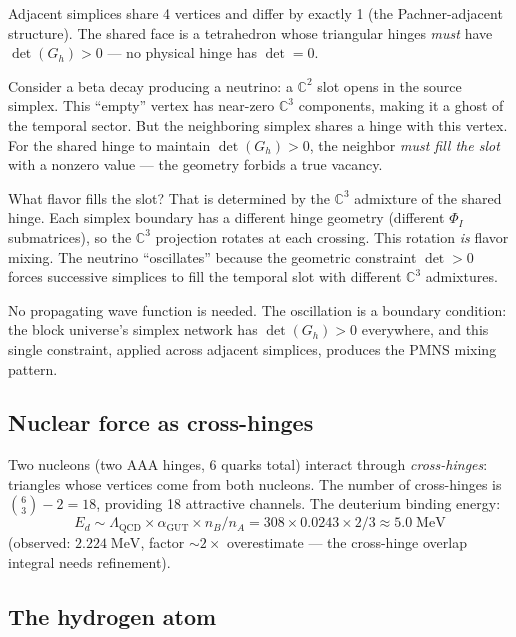 Adjacent simplices share 4 vertices and differ by exactly 1 (the Pachner-adjacent structure). The shared face is a tetrahedron whose triangular hinges \emph{must} have $\det(G_h) > 0$ --- no physical hinge has $\det = 0$.

Consider a beta decay producing a neutrino: a $\mathbb{C}^2$ slot opens in the source simplex. This ``empty'' vertex has near-zero $\mathbb{C}^3$ components, making it a ghost of the temporal sector. But the neighboring simplex shares a hinge with this vertex. For the shared hinge to maintain $\det(G_h) > 0$, the neighbor \emph{must fill the slot} with a nonzero value --- the geometry forbids a true vacancy.

What flavor fills the slot? That is determined by the $\mathbb{C}^3$ admixture of the shared hinge. Each simplex boundary has a different hinge geometry (different $\Phi_I$ submatrices), so the $\mathbb{C}^3$ projection rotates at each crossing. This rotation \emph{is} flavor mixing. The neutrino ``oscillates'' because the geometric constraint $\det > 0$ forces successive simplices to fill the temporal slot with different $\mathbb{C}^3$ admixtures.

No propagating wave function is needed. The oscillation is a boundary condition: the block universe's simplex network has $\det(G_h) > 0$ everywhere, and this single constraint, applied across adjacent simplices, produces the PMNS mixing pattern.

\subsection{Nuclear force as cross-hinges}

Two nucleons (two AAA hinges, 6 quarks total) interact through \emph{cross-hinges}: triangles whose vertices come from both nucleons. The number of cross-hinges is $\binom{6}{3} - 2 = 18$, providing 18 attractive channels. The deuterium binding energy:
\begin{equation}
E_d \sim \Lambda_\text{QCD} \times \alpha_\text{GUT} \times n_B/n_A = 308 \times 0.0243 \times 2/3 \approx 5.0\;\text{MeV}
\end{equation}
(observed: $2.224\;\text{MeV}$, factor $\sim 2\times$ overestimate --- the cross-hinge overlap integral needs refinement).

\subsection{The hydrogen atom}

